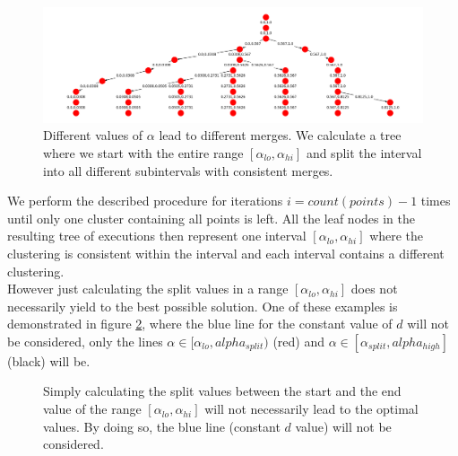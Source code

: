 \begin{figure}[H]
    \centering
    \includegraphics[width=\textwidth]{images/res_tree}
    \caption{Different values of $\alpha$ lead to different merges. We calculate a tree where we start with the entire range $[\alpha_{lo}, \alpha_{hi}]$ and split the interval into all different subintervals with consistent merges.}
    \label{fig:toe}
\end{figure}

We perform the described procedure for iterations $i = count(points) -1$ times until only one cluster containing all points is left. All the leaf nodes in the resulting tree of executions then represent one interval $[\alpha_{lo}, \alpha_{hi}]$ where the clustering is consistent within the interval and each interval contains a different clustering.\\

However just calculating the split values in a range $[\alpha_{lo}, \alpha_{hi}]$ does not necessarily yield to the best possible solution. One of these examples is demonstrated in figure \ref{fig:notoptimal}, where the blue line for the constant value of $d$ will not be considered, only the lines $\alpha \in [\alpha_{lo}, alpha_{split})$ (red) and $\alpha \in [\alpha_{split}, alpha_{high}]$ (black) will be.

\begin{figure}[H]
    \centering
    \caption{Simply calculating the split values between the start and the end value of the range $[\alpha_{lo}, \alpha_{hi}]$ will not necessarily lead to the optimal values. By doing so, the blue line (constant $d$ value) will not be considered.}
    \label{fig:notoptimal}
\end{figure}

